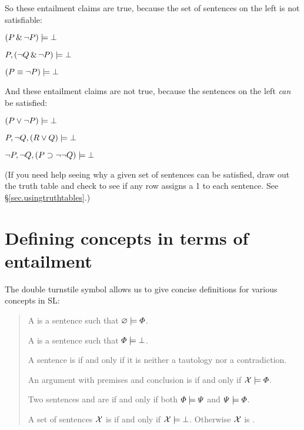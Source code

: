 
So these entailment claims are true, because the set of sentences on the left is not satisfiable:

\begin{earg}
\item[] $(P \,\&\, \neg P) \models \bot$
\item[] $P, (\neg Q \,\&\, \neg P) \models\bot$
\item[] $(P \equiv\neg P) \models\bot$
\end{earg}

And these entailment claims are not true, because the sentences on the left \emph{can} be satisfied:

\begin{earg}
\item[] $(P \vee \neg P) \models\bot$
\item[] $P, \neg Q, (R \vee Q) \models\bot$
\item[] $\neg P, \neg Q, (P \supset \neg\neg Q) \models\bot$
\end{earg}

(If you need help seeing why a given set of sentences can be satisfied, draw out the truth table and check to see if any row assigns a 1 to each sentence. See \S\ref{sec.usingtruthtables}.)




\section{Defining concepts in terms of entailment}


The double turnstile symbol allows us to give concise definitions for various concepts in SL:
\begin{quote}
A  is a sentence \metaA{}  such that $\varnothing\models\varPhi{}$.

A  is a sentence \metaA{} such that $\varPhi{}\models\bot$.

A sentence is  if and only if it is neither a tautology nor a contradiction.

An argument with premises \metaSetX{} and conclusion \metaA{} is  if and only if $\mathcal{X}{}\models\varPhi{}$.

Two sentences \metaA{} and \metaB{} are  if and only if both $\varPhi{}\models\varPsi{}$ and $\varPsi{}\models\varPhi{}$.

A set of sentences $\mathcal{X}{}$ is  if and only if $\mathcal{X}{}\models \bot$. Otherwise $\mathcal{X}{}$ is .\label{def.consistencySL}

 \end{quote}




